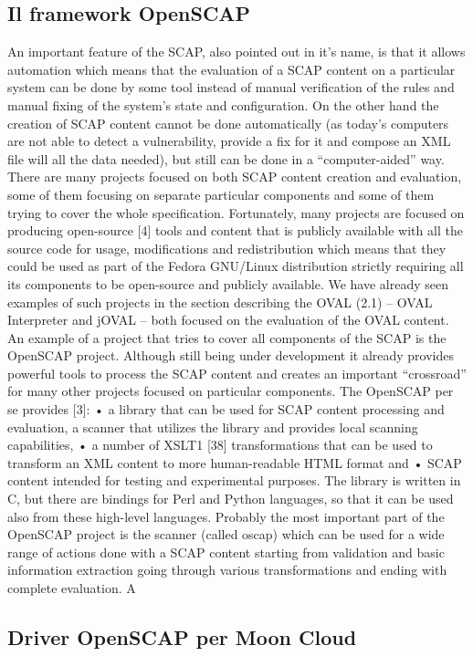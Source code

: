 \documentclass[../main.tex]{subfiles}
\begin{document}
\subsection{Il framework OpenSCAP}
An important feature of the SCAP, also pointed out in it’s name, is
that it allows automation which means that the evaluation of a SCAP
content on a particular system can be done by some tool instead of
manual verification of the rules and manual fixing of the system’s
state and configuration. On the other hand the creation of SCAP content
cannot be done automatically (as today’s computers are not able
to detect a vulnerability, provide a fix for it and compose an XML file
will all the data needed), but still can be done in a “computer-aided”
way. There are many projects focused on both SCAP content creation
and evaluation, some of them focusing on separate particular components
and some of them trying to cover the whole specification.
Fortunately, many projects are focused on producing open-source [4]
tools and content that is publicly available with all the source code
for usage, modifications and redistribution which means that they
could be used as part of the Fedora GNU/Linux distribution strictly
requiring all its components to be open-source and publicly available.
We have already seen examples of such projects in the section
describing the OVAL (2.1) – OVAL Interpreter and jOVAL – both focused
on the evaluation of the OVAL content.
An example of a project that tries to cover all components of the
SCAP is the OpenSCAP project. Although still being under development
it already provides powerful tools to process the SCAP content
and creates an important “crossroad” for many other projects focused
on particular components. The OpenSCAP per se provides [3]:
• a library that can be used for SCAP content processing and
evaluation,
a scanner that utilizes the library and provides local scanning
capabilities,
• a number of XSLT1
[38] transformations that can be used to
transform an XML content to more human-readable HTML
format and
• SCAP content intended for testing and experimental purposes.
The library is written in C, but there are bindings for Perl and Python
languages, so that it can be used also from these high-level languages.
Probably the most important part of the OpenSCAP project is the
scanner (called oscap) which can be used for a wide range of actions
done with a SCAP content starting from validation and basic
information extraction going through various transformations and
ending with complete evaluation. A

\subsection{Driver OpenSCAP per Moon Cloud}
\end{document}
